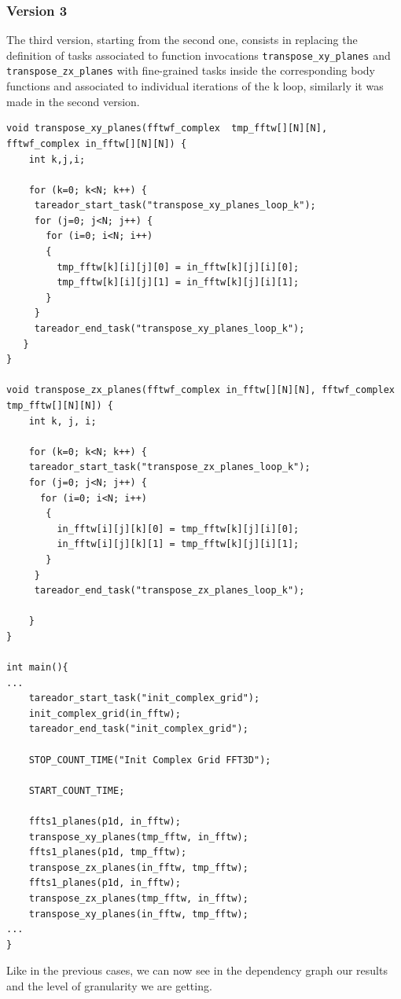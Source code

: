 \documentclass[12]{article}
\begin{document}
\subsubsection{Version 3}
The third version, starting from the second one, consists in replacing the definition of tasks associated to function invocations \texttt{transpose\_xy\_planes} and \texttt{transpose\_zx\_planes} with fine-grained tasks inside the corresponding body functions and associated to individual iterations of the k loop, similarly it was made in the second version. 
\begin{lstlisting}
void transpose_xy_planes(fftwf_complex  tmp_fftw[][N][N], fftwf_complex in_fftw[][N][N]) {
    int k,j,i;

    for (k=0; k<N; k++) {
     tareador_start_task("transpose_xy_planes_loop_k");
     for (j=0; j<N; j++) {
       for (i=0; i<N; i++)
       {
         tmp_fftw[k][i][j][0] = in_fftw[k][j][i][0];
         tmp_fftw[k][i][j][1] = in_fftw[k][j][i][1];
       }
     }
     tareador_end_task("transpose_xy_planes_loop_k"); 
   }
}

void transpose_zx_planes(fftwf_complex in_fftw[][N][N], fftwf_complex tmp_fftw[][N][N]) {
    int k, j, i;

    for (k=0; k<N; k++) {
    tareador_start_task("transpose_zx_planes_loop_k");
    for (j=0; j<N; j++) {
      for (i=0; i<N; i++)
       {
         in_fftw[i][j][k][0] = tmp_fftw[k][j][i][0];
         in_fftw[i][j][k][1] = tmp_fftw[k][j][i][1];
       }
     }
     tareador_end_task("transpose_zx_planes_loop_k");

    }
}

int main(){
...
    tareador_start_task("init_complex_grid");
    init_complex_grid(in_fftw);
    tareador_end_task("init_complex_grid");

    STOP_COUNT_TIME("Init Complex Grid FFT3D");

    START_COUNT_TIME;

    ffts1_planes(p1d, in_fftw);
    transpose_xy_planes(tmp_fftw, in_fftw);
    ffts1_planes(p1d, tmp_fftw);
    transpose_zx_planes(in_fftw, tmp_fftw);
    ffts1_planes(p1d, in_fftw);
    transpose_zx_planes(tmp_fftw, in_fftw);
    transpose_xy_planes(in_fftw, tmp_fftw);
...
}
\end{lstlisting}

Like in the previous cases, we can now see in the dependency graph our results and the level of granularity we are getting. 
\end{document}
